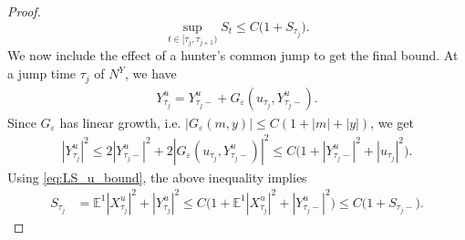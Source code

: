 \documentclass{article}
\numberwithin{equation}{section}
\begin{document}
\begin{proof}
\begin{equation}
    \sup_{t\in[\tau_j,\tau_{j+1})}S_t
    \le
    C\bigl(1+S_{\tau_j}\bigr).
    \label{eq:S_interval_bound}
\end{equation}
We now include the effect of a hunter's common jump to get the final bound. At a jump time $\tau_j$ of $N^Y$, we have
\begin{align*}
    Y_{\tau_j}^u = Y_{\tau_j-}^u
    + G_\varepsilon(u_{\tau_j},Y_{\tau_j-}^u).
\end{align*}
Since $G_\varepsilon$ has linear growth, i.e. $|G_\varepsilon(m,y)|\le C(1+|m|+|y|)$, 
we get
\begin{align}
    |Y_{\tau_j}^u|^2 \le
    2|Y_{\tau_j-}^u|^2
    +
    2|G_\varepsilon(u_{\tau_j},Y_{\tau_j-}^u)|^2
    \leq
    C\bigl(
        1+|Y_{\tau_j-}^u|^2+|u_{\tau_j}|^2
    \bigr).
\end{align}
Using \eqref{eq:LS_u_bound}, the above inequality implies
\begin{align}
    S_{\tau_j}
    &=
    \mathbb E^1|X_{\tau_j}^u|^2+|Y_{\tau_j}^u|^2
    \leq
    C\big(
        1+\mathbb E^1|X_{\tau_j}^u|^2+|Y_{\tau_j-}^u|^2
    \big) \leq
    C\bigl(1+S_{\tau_j-}\bigr).
    \label{eq:S_jump_bound}
\end{align}


\end{proof}
\end{document}
